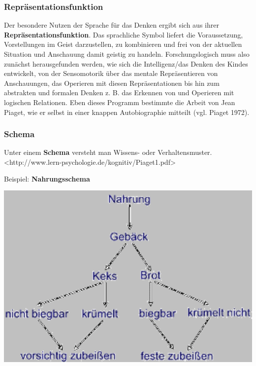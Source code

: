\documentclass[
  letterpaper,
]{scrbook}
\begin{document}
\hypertarget{repruxe4sentationsfunktion}{%
\subsubsection{Repräsentationsfunktion}\label{repruxe4sentationsfunktion}}

Der besondere Nutzen der Sprache für das Denken ergibt sich aus ihrer
\textbf{Repräsentationsfunktion}. Das sprachliche Symbol liefert die
Voraussetzung, Vorstellungen im Geist darzustellen, zu kombinieren und
frei von der aktuellen Situation und Anschauung damit geistig zu
handeln. Forschungslogisch muss also zunächst herausgefunden werden, wie
sich die Intelligenz/das Denken des Kindes entwickelt, von der
Sensomotorik über das mentale Repräsentieren von Anschauungen, das
Operieren mit diesen Repräsentationen bis hin zum abstrakten und
formalen Denken z. B. das Erkennen von und Operieren mit logischen
Relationen. Eben dieses Programm bestimmte die Arbeit von Jean Piaget,
wie er selbst in einer knappen Autobiographie mitteilt (vgl. Piaget
1972).

\hypertarget{schema}{%
\subsubsection{Schema}\label{schema}}

Unter einem \textbf{Schema} versteht man Wissens- oder Verhaltensmuster.
\textless http://www.lern-psychologie.de/kognitiv/Piaget1.pdf\textgreater{}

Beispiel: \textbf{Nahrungsschema}

\includegraphics[width=1\textwidth,height=\textheight]{./pictures/piaget_schema.png}
\end{document}
